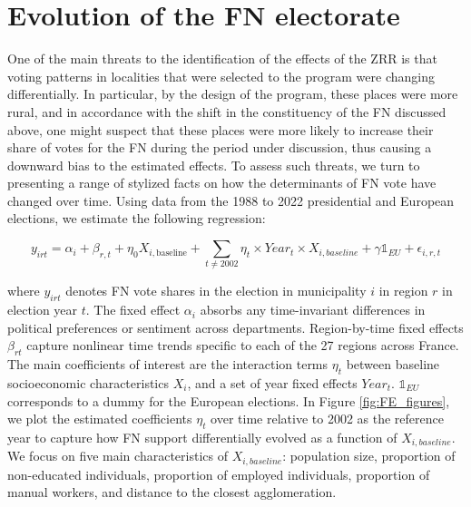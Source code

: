 \section{Evolution of the FN electorate}\label{fn-growth}

One of the main threats to the identification of the effects of the ZRR is that voting patterns in localities that were selected to the program were changing differentially. In particular, by the design of the program, these places were more rural, and in accordance with the shift in the constituency of the FN discussed above, one might suspect that these places were more likely to increase their share of votes for the FN during the period under discussion, thus causing a downward bias to the estimated effects. To assess such threats, we turn to presenting a range of stylized facts on how the determinants of FN vote have changed over time. Using data from the 1988 to 2022 presidential and European elections, we estimate the following regression:


\begin{equation}
y_{irt} = \alpha_i + \beta_{r,t} + \eta_0 X_{i,\text{baseline}}+ \sum_{t \neq 2002} \eta_t \times Year_t \times X_{i,baseline} + \gamma \mathds{1}_{EU} + \epsilon_{i,r,t}
\end{equation}


where $y_{irt}$ denotes FN vote shares in the election in municipality $i$ in region $r$ in election year $t$. The fixed effect $\alpha_i$ absorbs any time-invariant differences in political preferences or sentiment across departments. Region-by-time fixed effects $\beta_{rt}$ capture nonlinear time trends specific to each of the 27 regions across France. The main coefficients of interest are the interaction terms $\eta_{t}$ between baseline socioeconomic characteristics $X_i$, and a set of year fixed effects $Year_t$. $\mathds{1}_{EU}$ corresponds to a dummy for the European elections. In Figure \ref{fig:FE_figures}, we plot the estimated coefficients $\eta_t$ over time relative to 2002 as the reference year to capture how FN support differentially evolved as a function of $X_{i, baseline}$. We focus on five main characteristics of $X_{i, baseline}$: population size, proportion of non-educated individuals, proportion of employed individuals, proportion of manual workers, and distance to the closest agglomeration.


